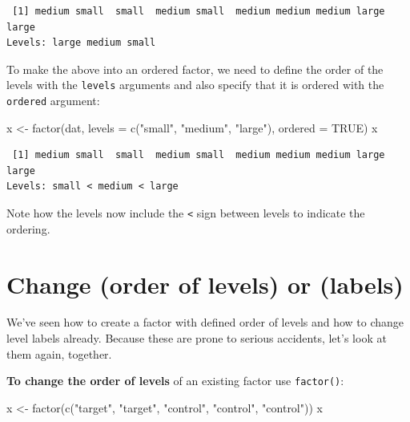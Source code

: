 \documentclass[
]{book}
\newenvironment{Shaded}{\begin{snugshade}}{\end{snugshade}}
\newcommand{\AttributeTok}[1]{\textcolor[rgb]{0.77,0.63,0.00}{#1}}
\newcommand{\ConstantTok}[1]{\textcolor[rgb]{0.00,0.00,0.00}{#1}}
\newcommand{\FunctionTok}[1]{\textcolor[rgb]{0.00,0.00,0.00}{#1}}
\newcommand{\NormalTok}[1]{#1}
\newcommand{\OtherTok}[1]{\textcolor[rgb]{0.56,0.35,0.01}{#1}}
\newcommand{\StringTok}[1]{\textcolor[rgb]{0.31,0.60,0.02}{#1}}
\begin{document}
\begin{verbatim}
 [1] medium small  small  medium small  medium medium medium large  large 
Levels: large medium small
\end{verbatim}

To make the above into an ordered factor, we need to define the order of the levels with the \texttt{levels} arguments and also specify that it is ordered with the \texttt{ordered} argument:

\begin{Shaded}
\begin{Highlighting}[]
\NormalTok{x }\OtherTok{\textless{}{-}} \FunctionTok{factor}\NormalTok{(dat,}
            \AttributeTok{levels =} \FunctionTok{c}\NormalTok{(}\StringTok{"small"}\NormalTok{, }\StringTok{"medium"}\NormalTok{, }\StringTok{"large"}\NormalTok{),}
            \AttributeTok{ordered =} \ConstantTok{TRUE}\NormalTok{)}
\NormalTok{x}
\end{Highlighting}
\end{Shaded}

\begin{verbatim}
 [1] medium small  small  medium small  medium medium medium large  large 
Levels: small < medium < large
\end{verbatim}

Note how the levels now include the \texttt{\textless{}} sign between levels to indicate the ordering.

\hypertarget{change-order-of-levels-or-labels}{%
\section{Change (order of levels) or (labels)}\label{change-order-of-levels-or-labels}}

We've seen how to create a factor with defined order of levels and how to change level labels already. Because these are prone to serious accidents, let's look at them again, together.

\textbf{To change the order of levels} of an existing factor use \texttt{factor()}:

\begin{Shaded}
\begin{Highlighting}[]
\NormalTok{x }\OtherTok{\textless{}{-}} \FunctionTok{factor}\NormalTok{(}\FunctionTok{c}\NormalTok{(}\StringTok{"target"}\NormalTok{, }\StringTok{"target"}\NormalTok{, }\StringTok{"control"}\NormalTok{, }\StringTok{"control"}\NormalTok{, }\StringTok{"control"}\NormalTok{))}
\NormalTok{x}
\end{Highlighting}
\end{Shaded}
\end{document}
